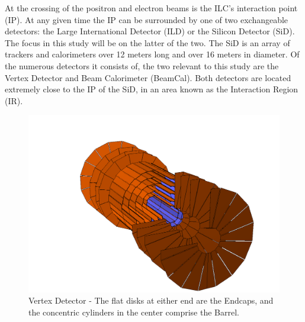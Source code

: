 \documentclass{report}
\begin{document}
                At the crossing of the positron and electron beams is the ILC's interaction point (IP). At any given time the IP can be surrounded by one of two exchangeable detectors: the Large International Detector (ILD) or the Silicon Detector (SiD). The focus in this study will be on the latter of the two. The SiD is an array of trackers and calorimeters over 12 meters long and over 16 meters in diameter. Of the numerous detectors it consists of, the two relevant to this study are the Vertex Detector and Beam Calorimeter (BeamCal). Both detectors are located extremely close to the IP of the SiD, in an area known as the Interaction Region (IR). 

                \begin{figure}[h]
                    \centering
                    \begin{minipage}{0.4\textwidth}
                        \includegraphics[width=\textwidth]{vertex}
                        \caption{Vertex Detector - The flat disks at either end are the Endcaps,
                                 and the concentric cylinders in the center comprise the Barrel.}
                        \label{fig__vertex}
                    \end{minipage}
                    \begin{minipage}{0.4\textwidth}

\end{minipage}
\end{figure}
\end{document}
